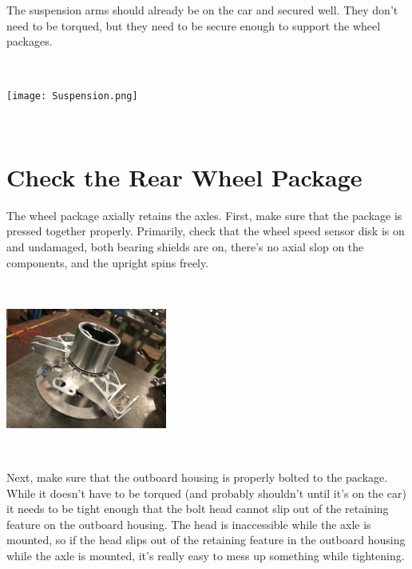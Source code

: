 \documentclass{article}
\begin{document}
The suspension arms should already be on the car and secured well. They don't need to be torqued, but they need to be secure enough to support the wheel packages.

\begin{minipage}{\linewidth}
$\,$

\begin{center}
\texttt{[image: Suspension.png]}

\end{center}
$\,$
\end{minipage}

\section{Check the Rear Wheel Package}

The wheel package axially retains the axles. First, make sure that the package is pressed together properly. Primarily, check that the wheel speed sensor disk is on and undamaged, both bearing shields are on, there's no axial slop on the components, and the upright spins freely.

\begin{minipage}{\linewidth}
$\,$

\begin{center}
\includegraphics[width = 150pt]{WheelPackage.png}

\end{center}
$\,$
\end{minipage}

Next, make sure that the outboard housing is properly bolted to the package. While it doesn't have to be torqued (and probably shouldn't until it's on the car) it needs to be tight enough that the bolt head cannot slip out of the retaining feature on the outboard housing. The head is inaccessible while the axle is mounted, so if the head slips out of the retaining feature in the outboard housing while the axle is mounted, it's really easy to mess up something while tightening.
\end{document}
